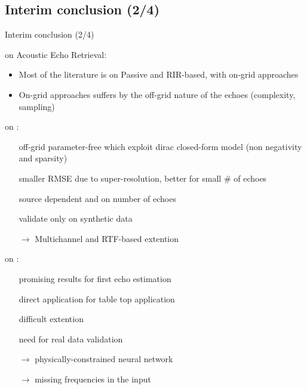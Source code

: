 \subsection{Interim conclusion (2/4)}

\begin{frame}{Interim conclusion (2/4)}
    \begin{block}{on Acoustic Echo Retrieval:}
        \begin{itemize}
            \item Most of the literature is on Passive and RIR-based, with on-grid approaches
            \item On-grid approaches suffers by the off-grid nature of the echoes (complexity, sampling)
        \end{itemize}
    \end{block}

    \begin{block}{on \blaster:}
        \begin{itemize}
            \item[\cmark] off-grid parameter-free which exploit dirac closed-form model (non negativity and sparsity)
            \item[\cmark] smaller RMSE due to super-resolution, better for small \# of echoes
            \item[\xmark] source dependent and on number of echoes
            \item[\xmark] validate only on synthetic data
            \item[$\rightarrow$] Multichannel and RTF-based extention
        \end{itemize}
    \end{block}

    \begin{block}{on \lantern:}
        \begin{itemize}
            \item[\cmark] promising results for first echo estimation
            \item[\cmark] direct application for table top application
            \item[\xmark] difficult extention
            \item[\xmark] need for real data validation
            \item[$\rightarrow$] physically-constrained neural network
            \item[$\rightarrow$] missing frequencies in the input
        \end{itemize}
    \end{block}
\end{frame}